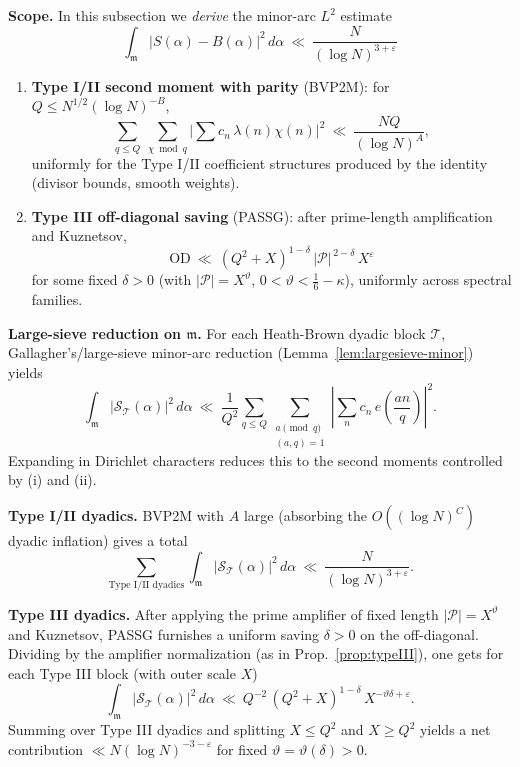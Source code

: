 \documentclass[11pt]{article}
\theoremstyle{definition}
\theoremstyle{remark}
\numberwithin{equation}{part}
\begin{document}
\noindent\textbf{Scope.} In this subsection we \emph{derive} the minor-arc $L^2$ estimate
\[\int_{\mathfrak m}|S(\alpha)-B(\alpha)|^2\,d\alpha\ \ll\ \frac{N}{(\log N)^{3+\varepsilon}}\]
\begin{enumerate}[label=(\roman*)]
	\item \textbf{Type I/II second moment with parity} (BVP2M): for $Q\le N^{1/2}(\log N)^{-B}$,
	      \[
		      \sum_{q\le Q}\ \sum_{\chi\bmod q}\Big|\sum c_n\,\lambda(n)\chi(n)\Big|^2
		      \ \ll\ \frac{NQ}{(\log N)^A},
	      \]
	      uniformly for the Type I/II coefficient structures produced by the identity (divisor bounds, smooth weights).

	\item \textbf{Type III off-diagonal saving} (PASSG): after prime-length amplification and Kuznetsov,
	      \[
		      \mathrm{OD}\ \ll\ (Q^2+X)^{1-\delta}\,|\mathcal P|^{\,2-\delta}\,X^{\varepsilon}
	      \]
	      for some fixed $\delta>0$ (with $|\mathcal P|=X^\vartheta$, $0<\vartheta<\tfrac16-\kappa$), uniformly across spectral families.
\end{enumerate}

\medskip
\noindent\textbf{Large-sieve reduction on $\mathfrak m$.} For each Heath-Brown dyadic block $\mathcal T$, Gallagher's/large-sieve minor-arc reduction (Lemma~\ref{lem:largesieve-minor}) yields
\[
	\int_{\mathfrak m}\big|\mathcal S_{\mathcal T}(\alpha)\big|^2\,d\alpha
	\ \ll\ \frac{1}{Q^2}\sum_{q\le Q}\sum_{\substack{a\!\!\!\pmod q\\(a,q)=1}}
	\left|\sum_n c_n\,e\!\left(\frac{an}{q}\right)\right|^2.
\]
Expanding in Dirichlet characters reduces this to the second moments controlled by (i) and (ii).

\medskip
\noindent\textbf{Type I/II dyadics.} BVP2M with $A$ large (absorbing the $O((\log N)^C)$ dyadic inflation) gives a total
\[
	\sum_{\text{Type I/II dyadics}}
	\int_{\mathfrak m}\big|\mathcal S_{\mathcal T}(\alpha)\big|^2\,d\alpha
	\ \ll\ \frac{N}{(\log N)^{3+\varepsilon}}.
\]

\medskip
\noindent\textbf{Type III dyadics.} After applying the prime amplifier of fixed length $|\mathcal P|=X^\vartheta$ and Kuznetsov, PASSG furnishes a uniform saving $\delta>0$ on the off-diagonal. Dividing by the amplifier normalization (as in Prop.~\ref{prop:typeIII}), one gets for each Type III block (with outer scale $X$)
\[
	\int_{\mathfrak m}\big|\mathcal S_{\mathcal T}(\alpha)\big|^2\,d\alpha
	\ \ll\ Q^{-2}\,(Q^2+X)^{1-\delta}\,X^{-\vartheta\delta+\varepsilon}.
\]
Summing over Type III dyadics and splitting $X\le Q^2$ and $X\ge Q^2$ yields a net contribution $\ll N(\log N)^{-3-\varepsilon}$ for fixed $\vartheta=\vartheta(\delta)>0$.
\end{document}
